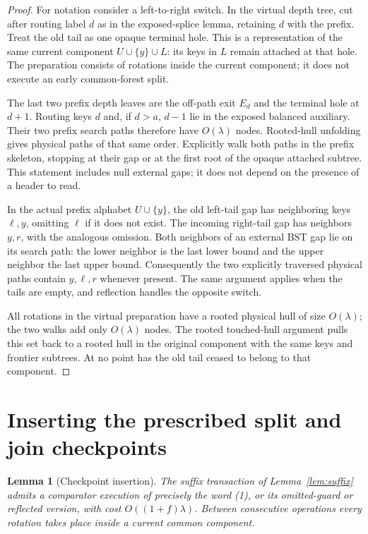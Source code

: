 \documentclass[11pt]{article}
\newtheorem{lemma}[theorem]{Lemma}
\begin{document}
\begin{proof}
For notation consider a left-to-right switch. In the virtual depth
tree, cut after routing label $d$ as in the exposed-splice lemma,
retaining $d$ with the prefix. Treat the old tail as one opaque
terminal hole. This is a representation of the same current component
$U\cup\{y\}\cup L$: its keys in $L$ remain attached at that hole.
The preparation consists of rotations inside the current component;
it does not execute an early common-forest split.

The last two prefix depth leaves are the off-path exit $E_d$ and the
terminal hole at $d+1$. Routing keys $d$ and, if $d>a$, $d-1$ lie in
the exposed balanced auxiliary. Their two prefix search paths therefore
have $O(\lambda)$ nodes. Rooted-hull unfolding gives physical paths
of that same order. Explicitly walk both paths in the prefix skeleton,
stopping at their gap or at the first root of the opaque attached
subtree. This statement includes null external gaps; it does not
depend on the presence of a header to read.

In the actual prefix alphabet $U\cup\{y\}$, the old left-tail gap
has neighboring keys $\ell,y$, omitting $\ell$ if it does not exist.
The incoming right-tail gap has neighbors $y,r$, with the analogous
omission. Both neighbors of an external BST gap lie on its search path:
the lower neighbor is the last lower bound and the upper neighbor the
last upper bound. Consequently the two explicitly traversed physical
paths contain $y,\ell,r$ whenever present. The same argument applies
when the tails are empty, and reflection handles the opposite switch.

All rotations in the virtual preparation have a rooted physical hull
of size $O(\lambda)$; the two walks add only $O(\lambda)$ nodes.
The rooted touched-hull argument pulls this set back to a rooted hull
in the original component with the same keys and frontier subtrees.
At no point has the old tail ceased to belong to that component.
\end{proof}

\section{Inserting the prescribed split and join checkpoints}

\begin{lemma}[Checkpoint insertion]\label{lem:checkpoints}
The suffix transaction of Lemma~\ref{lem:suffix} admits a comparator
execution of precisely the word (1), or its omitted-guard or reflected
version, with cost $O((1+f)\lambda)$. Between consecutive operations
every rotation takes place inside a current common component.
\end{lemma}
\end{document}
